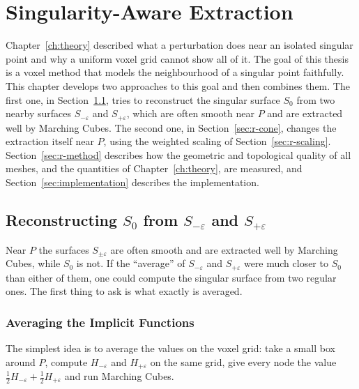 \documentclass[12pt, a4paper, oneside]{book}
\theoremstyle{plain}
\theoremstyle{definition}
\theoremstyle{remark}
\theoremstyle{definition}
\begin{document}
\chapter{Singularity-Aware Extraction}
\label{ch:method}

Chapter~\ref{ch:theory} described what a perturbation does near an isolated singular point and why a uniform voxel grid cannot show all of it. The goal of this thesis is a voxel method that models the neighbourhood of a singular point faithfully. This chapter develops two approaches to this goal and then combines them. The first one, in Section~\ref{sec:r-interp}, tries to reconstruct the singular surface $S_0$ from two nearby surfaces $S_{-\varepsilon}$ and $S_{+\varepsilon}$, which are often smooth near $P$ and are extracted well by Marching Cubes. The second one, in Section~\ref{sec:r-cone}, changes the extraction itself near $P$, using the weighted scaling of Section~\ref{sec:r-scaling}. Section~\ref{sec:r-method} describes how the geometric and topological quality of all meshes, and the quantities of Chapter~\ref{ch:theory}, are measured, and Section~\ref{sec:implementation} describes the implementation.

\section{Reconstructing $S_0$ from $S_{-\varepsilon}$ and $S_{+\varepsilon}$}
\label{sec:r-interp}

Near $P$ the surfaces $S_{\pm\varepsilon}$ are often smooth and are extracted well by Marching Cubes, while $S_0$ is not. If the ``average'' of $S_{-\varepsilon}$ and $S_{+\varepsilon}$ were much closer to $S_0$ than either of them, one could compute the singular surface from two regular ones. The first thing to ask is what exactly is averaged.

\subsection{Averaging the Implicit Functions}

The simplest idea is to average the values on the voxel grid: take a small box around $P$, compute $H_{-\varepsilon}$ and $H_{+\varepsilon}$ on the same grid, give every node the value $\frac12H_{-\varepsilon}+\frac12H_{+\varepsilon}$ and run Marching Cubes.
\end{document}
